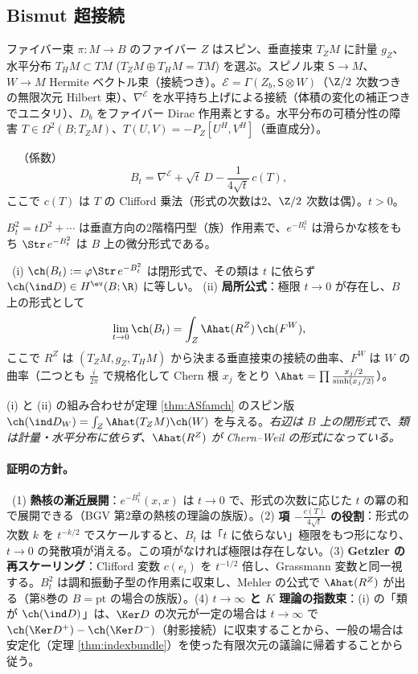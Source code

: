 \subsection{Bismut 超接続}
ファイバー束 $\pi:M\to B$ のファイバー $Z$ はスピン、垂直接束 $T_ZM$ に計量 $g_Z$、水平分布 $T_HM\subset TM$ ($T_ZM\oplus T_HM=TM$) を選ぶ。スピノル束 $\mathsf S\to M$、$W\to M$ Hermite ベクトル束（接続つき）。$\mathcal E=\Gamma(Z_b,\mathsf S\otimes W)$（$\Z/2$ 次数つきの無限次元 Hilbert 束）、$\nabla^{\mathcal E}$ を水平持ち上げによる接続（体積の変化の補正つきでユニタリ）、$D_b$ をファイバー Dirac 作用素とする。水平分布の可積分性の障害 $T\in\Omega^2(B;T_ZM)$、$T(U,V)=-P_Z[U^H,V^H]$（垂直成分）。
\begin{defn}\label{def:Bismut}\tC\ \tQ\ （係数）
\[
B_t=\nabla^{\mathcal E}+\sqrt t\,D-\frac1{4\sqrt t}\,c(T),
\]
ここで $c(T)$ は $T$ の Clifford 乗法（形式の次数は2、$\Z/2$ 次数は偶）。$t>0$。
\end{defn}
$B_t^2=tD^2+\cdots$ は垂直方向の2階楕円型（族）作用素で、$e^{-B_t^2}$ は滑らかな核をもち $\Str\,e^{-B_t^2}$ は $B$ 上の微分形式である。
\begin{thm}\label{thm:Bismut}\tC\
(i) $\ch(B_t):=\varphi\Str\,e^{-B_t^2}$ は閉形式で、その類は $t$ に依らず $\ch(\ind D)\in H^{\ev}(B;\R)$ に等しい。
(ii) \textbf{局所公式}：極限 $t\to0$ が存在し、$B$ 上の形式として
\[
\lim_{t\to0}\ch(B_t)=\int_Z\Ahat(R^Z)\,\ch(F^W),
\]
ここで $R^Z$ は $(T_ZM,g_Z,T_HM)$ から決まる垂直接束の接続の曲率、$F^W$ は $W$ の曲率（二つとも $\frac i{2\pi}$ で規格化して Chern 根 $x_j$ をとり $\Ahat=\prod\frac{x_j/2}{\sinh(x_j/2)}$）。
\end{thm}
(i) と (ii) の組み合わせが定理 \ref{thm:ASfamch} のスピン版 $\ch(\ind D_W)=\int_Z\Ahat(T_ZM)\ch(W)$ を与える。\emph{右辺は $B$ 上の閉形式で、類は計量・水平分布に依らず、$\Ahat(R^Z)$ が Chern--Weil の形式になっている。}

\paragraph{証明の方針。}\tC\ (1) \textbf{熱核の漸近展開}：$e^{-B_t^2}(x,x)$ は $t\to0$ で、形式の次数に応じた $t$ の冪の和で展開できる（BGV 第2章の熱核の理論の族版）。(2) \textbf{項 $-\frac{c(T)}{4\sqrt t}$ の役割}：形式の次数 $k$ を $t^{-k/2}$ でスケールすると、$B_t$ は「$t$ に依らない」極限をもつ形になり、$t\to0$ の発散項が消える。この項がなければ極限は存在しない。(3) \textbf{Getzler の再スケーリング}：Clifford 変数 $c(e_i)$ を $t^{-1/2}$ 倍し、Grassmann 変数と同一視する。$B_t^2$ は調和振動子型の作用素に収束し、Mehler の公式で $\Ahat(R^Z)$ が出る（第8巻の $B=\mathrm{pt}$ の場合の族版）。(4) \textbf{$t\to\infty$ と $K$ 理論の指数束}：(i) の「類が $\ch(\ind D)$」は、$\Ker D$ の次元が一定の場合は $t\to\infty$ で $\ch(\Ker D^+)-\ch(\Ker D^-)$（射影接続）に収束することから、一般の場合は安定化（定理 \ref{thm:indexbundle}）を使った有限次元の議論に帰着することから従う。

